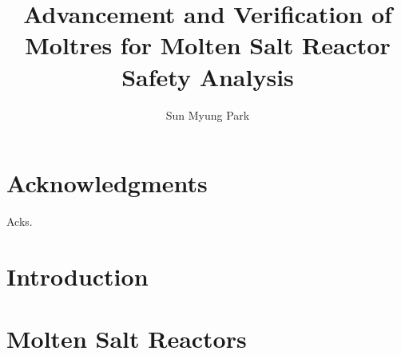 \documentclass[edeposit,fullpage,11pt]{uiucthesis2018}
\title{Advancement and Verification of Moltres for Molten Salt Reactor Safety
Analysis}
\author{Sun Myung Park}
\begin{document}
\maketitle

\frontmatter
\begin{abstract}



\end{abstract}

\chapter*{Acknowledgments}

Acks.


\tableofcontents
\listoftables
\listoffigures

\printglossary[title=List of Abbreviations,type=\acronymtype,nonumberlist,
nogroupskip=true]

\pagebreak
\mainmatter
\glsresetall

\chapter{Introduction}
\label{chap:intro}


\chapter{Molten Salt Reactors}
\label{chap:msr}

\end{document}
